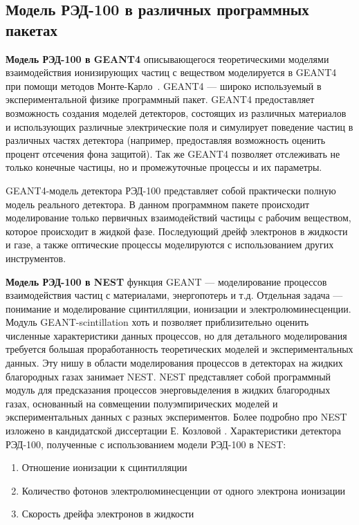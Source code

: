 \subsection{Модель РЭД-100 в различных программных пакетах}
\label{subsect2_3_1}
\textbf{Модель РЭД-100 в GEANT4}
 описывающегося теоретическими моделями взаимодействия ионизирующих частиц с веществом моделируется в GEANT4 при помощи методов Монте-Карло~\cite{ALLISON2016186}. GEANT4 — широко используемый в экспериментальной физике программный пакет. GEANT4 предоставляет возможность создания моделей детекторов, состоящих
из различных материалов и использующих различные электрические поля и симулирует поведение частиц в различных частях детектора (например, предоставляя возможность оценить процент отсечения фона защитой). Так же GEANT4 позволяет отслеживать не только конечные частицы, но и промежуточные процессы и их параметры.
\par GEANT4-модель детектора РЭД-100 представляет собой практически полную модель реального детектора. В данном программном пакете происходит моделирование только первичных взаимодействий частицы с рабочим веществом, которое происходит в жидкой фазе. Последующий дрейф электронов в жидкости и газе, а также оптические процессы моделируются с использованием других инструментов.

\par\textbf{Модель РЭД-100 в NEST}
 функция GEANT — моделирование процессов взаимодействия частиц с материалами, энергопотерь и т.д. Отдельная задача — понимание и моделирование сцинтилляции, ионизации и электролюминесценции. Модуль GEANT-scintillation хоть и позволяет приблизительно оценить численные характеристики данных процессов, но для детального моделирования требуется большая проработанность теоретических моделей и экспериментальных данных. Эту нишу в области моделирования процессов в детекторах на жидких благородных газах занимает NEST. NEST представляет собой программный модуль для предсказания процессов энерговыделения в жидких благородных газах, основанный на совмещении полуэмпирических моделей и экспериментальных данных с разных экспериментов. Более подробно про NEST изложено в кандидатской диссертации Е. Козловой \cite{Kate_thesis}. 
Характеристики детектора РЭД-100, полученные с использованием модели РЭД-100 в NEST:
\begin{enumerate}
    \item Отношение ионизации к сцинтилляции
    \item Количество фотонов электролюминесценции от одного электрона ионизации
    \item Скорость дрейфа электронов в жидкости
\end{enumerate}

